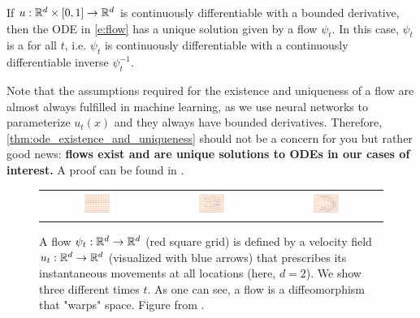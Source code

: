 \begin{theorem}
\label{thm:ode_existence_and_uniqueness}
If $u:\mathbb{R}^d\times[0,1]\to\mathbb{R}^d$ is continuously differentiable with a bounded derivative, then the ODE in \eqref{e:flow} has a unique solution given by a flow $\psi_t$. In this case, $\psi_t$ is a  for all $t$, i.e. $\psi_t$ is continuously differentiable with a continuously differentiable inverse $\psi_t^{-1}$.
\end{theorem}
Note that the assumptions required for the existence and uniqueness of a flow are almost always fulfilled in machine learning, as we use neural networks to parameterize $u_t(x)$ and they always have bounded derivatives. Therefore, \cref{thm:ode_existence_and_uniqueness} should not be a concern for you but rather good news: \textbf{flows exist and are unique solutions to ODEs in our cases of interest.} A proof can be found in \citep{perko2013differential,coddington1956theory}.

\begin{figure}
    \centering
    \begin{tabular}{ccc}
         \includegraphics[width=0.3\textwidth]{fm_guide_assets/flow_1.png} &
         \includegraphics[width=0.3\textwidth]{fm_guide_assets/flow_10.png} &
         \includegraphics[width=0.3\textwidth]{fm_guide_assets/flow_16.png} 
    \end{tabular}
    \caption{A flow $\psi_t:\mathbb R^d\rightarrow \mathbb R^d$ (red square grid) is defined by a velocity field $u_t :\mathbb R^d\rightarrow\mathbb R^d$ (visualized with blue arrows) that prescribes its instantaneous movements at all locations (here, $d=2$). We show three different times $t$. As one can see, a flow is a diffeomorphism that "warps" space. Figure from \citep{lipman2024flow}.}
    \label{fig:flow}
\end{figure}

